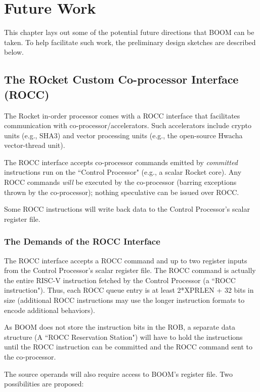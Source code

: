 \chapter{Future Work}

This chapter lays out some of the potential future directions that BOOM can be taken.  To help facilitate such work, the preliminary design sketches are described below. 

\section{The ROcket Custom Co-processor Interface (ROCC)}

The Rocket in-order processor comes with a ROCC interface that facilitates communication with co-processor/accelerators.  Such accelerators include crypto units (e.g., SHA3) and vector processing units (e.g., the open-source Hwacha vector-thread unit\cite{hwacha}). 

The ROCC interface accepts co-processor commands emitted by {\em committed} instructions run on the ``Control Processor" (e.g., a scalar Rocket core).  Any ROCC commands {\em will} be executed by the co-processor (barring exceptions thrown by the co-processor); nothing speculative can be issued over ROCC. 

Some ROCC instructions will write back data to the Control Processor's scalar register file. 

\subsection{The Demands of the ROCC Interface}


The ROCC interface accepts a ROCC command and up to two register inputs from the Control Processor's scalar register file. 
The ROCC command is actually the entire RISC-V instruction fetched by the Control Processor (a ``ROCC instruction"). Thus, each ROCC queue entry is at least 2*XPRLEN + 32 bits in size (additional ROCC instructions may use the longer instruction formats to encode additional behaviors). 

As BOOM does not store the instruction bits in the ROB, a separate data structure (A ``ROCC Reservation Station") will have to hold the instructions until the ROCC instruction can be committed and the ROCC command sent to the co-processor. 

The source operands will also require access to BOOM's register file.  Two possibilities are proposed:

